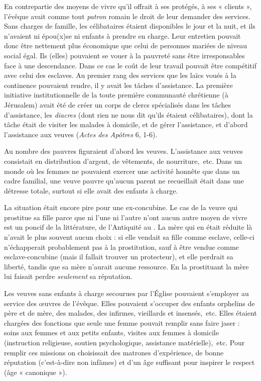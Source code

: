  En contrepartie des moyens de vivre qu'il offrait à ses protégés, à ses « clients », l'évêque avait comme tout \emph{patron} romain le droit de leur demander des services. Sans charges de famille, les célibataires étaient disponibles le jour et la nuit, et ils n'avaient ni épou(x)se ni enfants à prendre en charge. Leur entretien pouvait donc être nettement plus économique que celui de personnes mariées de niveau social égal. Ils (elles) pouvaient se vouer à la pauvreté sans être irresponsables face à une descendance. Dans ce cas le coût de leur travail pouvait être compétitif avec celui des esclaves. Au premier rang des services que les laïcs voués à la continence pouvaient rendre, il y avait les tâches d'assistance. La première initiative institutionnelle de la toute première communauté chrétienne (à Jérusalem) avait été de créer un corps de clercs spécialisés dans les tâches d'assistance, les \emph{diacres} (dont rien ne nous dit qu'ils étaient célibataires), dont la tâche était de visiter les malades à domicile, et de gérer l'assistance, et d'abord l'assistance aux veuves (\emph{Actes des Apôtres} 6, 1-6). 



Au nombre des pauvres figuraient d'abord les veuves. L'assistance aux veuves consistait en distribution d'argent, de vêtements, de nourriture,~etc. Dans un monde où les femmes ne pouvaient exercer une activité honnête que dans un cadre familial, une veuve pauvre qu'aucun parent ne recueillait était dans une détresse totale, surtout si elle avait des enfants à charge. 

 La situation était encore pire pour une ex-concubine. Le cas de la veuve qui prostitue sa fille parce que ni l'une ni l'autre n'ont aucun autre moyen de vivre est un poncif de la littérature, de l'Antiquité au . La mère qui en était réduite là n'avait le plus souvent aucun choix : si elle vendait sa fille comme esclave, celle-ci n'échapperait probablement pas à la prostitution, sauf à être vendue comme esclave-concubine (mais il fallait trouver un protecteur), et elle perdrait sa liberté, tandis que sa mère n'aurait aucune ressource. En la prostituant la mère lui faisait perdre \emph{seulement} sa réputation. 

 Les veuves sans enfants à charge secourues par l'Église pouvaient s'employer au service des œuvres de l'évêque. Elles pouvaient s'occuper des enfants orphelins de père et de mère, des malades, des infirmes, vieillards et insensés,~etc. Elles étaient chargées des fonctions que seule une femme pouvait remplir sans faire jaser : soins aux femmes et aux petits enfants, visites aux femmes à domicile (instruction religieuse, soutien psychologique, assistance matérielle),~etc. Pour remplir ces missions on choisissait des matrones d'expérience, de bonne réputation (c'est-à-dire non infâmes) et d'un âge suffisant pour inspirer le respect (âge « canonique »). 

